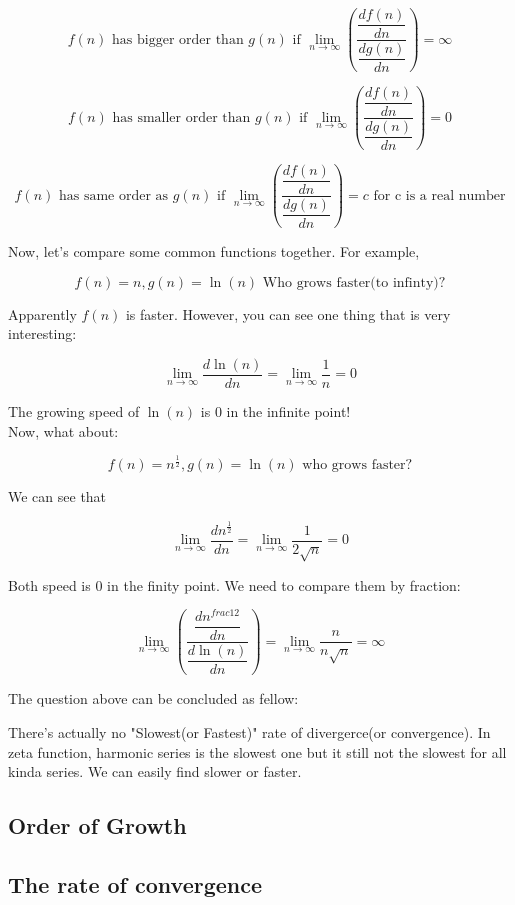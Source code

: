 \documentclass{article}
\begin{document}
  \[
	  f(n) \text{ has bigger order than } g(n) \text{ if } \displaystyle \lim_{n \to \infty} \left( \dfrac{\dfrac{df(n)}{dn}}{\dfrac{dg(n)}{dn}} \right) = \infty
  \]


  \[
	  f(n) \text{ has smaller order than } g(n) \text{ if } \displaystyle \lim_{n \to \infty} \left( \dfrac{\dfrac{df(n)}{dn}}{\dfrac{dg(n)}{dn}} \right) = 0
  \]

  \[
	  f(n) \text{ has same order as } g(n) \text{ if } \displaystyle \lim_{n \to \infty} \left( \dfrac{\dfrac{df(n)}{dn}}{\dfrac{dg(n)}{dn}} \right) = c \text{ for c is a real number}
  \]

  Now, let's compare some common functions together. For example, 

  \[
	  f(n) = n, g(n) = \ln(n) \text{ Who grows faster(to infinty)?} 
  \]

  Apparently $f(n)$ is faster. However, you can see one thing that is very interesting:

  \[
	  \lim_{n \to \infty} \dfrac{d\ln(n)}{dn} = \lim_{n \to \infty} \dfrac{1}{n} = 0
  \]

  The growing speed of $\ln(n)$ is $0$ in the infinite point! \\

  Now, what about:

  \[
	  f(n) = n^{\frac{1}{2}}, g(n) = \ln(n) \text{ who grows faster?}
  \]
  
  We can see that 

  \[
	  \displaystyle \lim_{n \to \infty} \dfrac{dn^{\frac{1}{2}}}{dn} = \lim_{n \to \infty} \dfrac{1}{2\sqrt{n}} = 0
  \]

  Both speed is $0$ in the finity point. We need to compare them by fraction:

  \[
	  \displaystyle \lim_{n \to \infty} \left( \dfrac{\dfrac{dn^{frac{1}{2}}}{dn}}{\dfrac{d\ln(n)}{dn}} \right) = \lim_{n \to \infty} \dfrac{n}{n\sqrt{n}} = \infty
  \]







  The question above can be concluded as fellow:



  There's actually no "Slowest(or Fastest)" rate of divergerce(or convergence). In zeta function, harmonic series is the slowest one but it still not the slowest for all kinda series. We can easily find slower or faster.

  \subsection{Order of Growth}

  



  \subsection{The rate of convergence}
\end{document}
